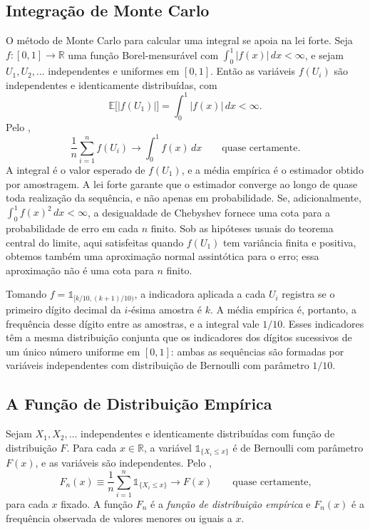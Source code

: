 \documentclass[12pt,portuguese]{article}
\theoremstyle{definition}
\theoremstyle{plainexercise}
\theoremstyle{starredexercise}
\theoremstyle{definition}
\begin{document}
\subsection{Integração de Monte Carlo}\label{subsec:monte-carlo}

O método de Monte Carlo para calcular uma integral se apoia na lei forte. Seja
$f:[0,1]\to\mathbb{R}$ uma função Borel-mensurável com
$\int_0^1|f(x)|\,dx<\infty$, e sejam $U_1,U_2,\ldots$
independentes e uniformes em $[0,1]$. Então as variáveis $f(U_i)$ são
independentes e identicamente distribuídas, com
\[
\mathbb{E}\bigl[|f(U_1)|\bigr]=\int_0^1|f(x)|\,dx<\infty.
\]
Pelo ,
\begin{equation}\label{eq:monte-carlo}
\frac{1}{n}\sum_{i=1}^{n}f(U_i)\longrightarrow\int_0^1f(x)\,dx
\qquad\text{quase certamente.}
\end{equation}
A integral é o valor esperado de $f(U_1)$, e a média empírica é o estimador
obtido por amostragem. A lei forte garante que o estimador converge ao longo de
quase toda realização da sequência, e não apenas em probabilidade. Se,
adicionalmente, $\int_0^1 f(x)^2\,dx<\infty$, a desigualdade de Chebyshev
fornece uma cota para a probabilidade de erro em cada $n$ finito. Sob as
hipóteses usuais do teorema central do limite, aqui satisfeitas quando
$f(U_1)$ tem variância finita e positiva, obtemos também uma aproximação
normal assintótica para o erro; essa aproximação não é uma cota para $n$
finito.

Tomando $f=\mathds{1}_{[k/10,(k+1)/10)}$, a indicadora aplicada a cada $U_i$
registra se o primeiro dígito decimal da $i$-ésima amostra é $k$. A média
empírica é, portanto, a frequência desse dígito entre as amostras, e a integral
vale $1/10$. Esses indicadores têm a mesma distribuição conjunta que os
indicadores dos dígitos sucessivos de um único número uniforme em $[0,1]$:
ambas as sequências são formadas por variáveis independentes com distribuição
de Bernoulli com parâmetro $1/10$.

\subsection{A Função de Distribuição Empírica}\label{subsec:empirica}

Sejam $X_1,X_2,\ldots$ independentes e identicamente distribuídas com função de
distribuição $F$. Para cada $x\in\mathbb{R}$, a variável
$\mathds{1}_{\{X_i\leqslant x\}}$ é de Bernoulli com parâmetro $F(x)$, e as
variáveis são independentes. Pelo ,
\begin{equation}\label{eq:empirica-pontual}
F_n(x)\equiv\frac{1}{n}\sum_{i=1}^{n}\mathds{1}_{\{X_i\leqslant x\}}
\longrightarrow F(x)
\qquad\text{quase certamente,}
\end{equation}
para cada $x$ fixado. A função $F_n$ é a \emph{função de distribuição empírica}
e $F_n(x)$ é a frequência observada de valores menores ou iguais a $x$.
\end{document}
